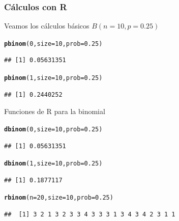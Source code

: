 \documentclass[handout]{beamer}\usepackage[]{graphicx}\usepackage[]{color}
\makeatletter
\newcommand{\hlnum}[1]{\textcolor[rgb]{0.686,0.059,0.569}{#1}}%
\newcommand{\hlstd}[1]{\textcolor[rgb]{0.345,0.345,0.345}{#1}}%
\newcommand{\hlkwc}[1]{\textcolor[rgb]{0.333,0.667,0.333}{#1}}%
\newcommand{\hlkwd}[1]{\textcolor[rgb]{0.737,0.353,0.396}{\textbf{#1}}}%
\newenvironment{kframe}{%
 \def\at@end@of@kframe{}%
 \ifinner\ifhmode%
  \def\at@end@of@kframe{\end{minipage}}%
  \begin{minipage}{\columnwidth}%
 \fi\fi%
 \def\FrameCommand##1{\hskip\@totalleftmargin \hskip-\fboxsep
 \colorbox{shadecolor}{##1}\hskip-\fboxsep
     \hskip-\linewidth \hskip-\@totalleftmargin \hskip\columnwidth}%
 \MakeFramed {\advance\hsize-\width
   \@totalleftmargin\z@ \linewidth\hsize
   \@setminipage}}%
 {\par\unskip\endMakeFramed%
 \at@end@of@kframe}
\newenvironment{knitrout}{}{} %
\theoremstyle{plain}
\theoremstyle{definition}
\makeatother
\begin{document}
\begin{frame}[fragile]
\frametitle{Cálculos con R}
Veamos los cálculos básicos $B(n=10,p=0.25)$

\begin{knitrout}
\color{fgcolor}\begin{kframe}
\begin{alltt}
\hlkwd{pbinom}\hlstd{(}\hlnum{0}\hlstd{,}\hlkwc{size}\hlstd{=}\hlnum{10}\hlstd{,}\hlkwc{prob}\hlstd{=}\hlnum{0.25}\hlstd{)}
\end{alltt}
\begin{verbatim}
## [1] 0.05631351
\end{verbatim}
\begin{alltt}
\hlkwd{pbinom}\hlstd{(}\hlnum{1}\hlstd{,}\hlkwc{size}\hlstd{=}\hlnum{10}\hlstd{,}\hlkwc{prob}\hlstd{=}\hlnum{0.25}\hlstd{)}
\end{alltt}
\begin{verbatim}
## [1] 0.2440252
\end{verbatim}
\end{kframe}
\end{knitrout}

\end{frame}

\begin{frame}[fragile]
Funciones de R para la binomial 

\begin{knitrout}
\color{fgcolor}\begin{kframe}
\begin{alltt}
\hlkwd{dbinom}\hlstd{(}\hlnum{0}\hlstd{,}\hlkwc{size}\hlstd{=}\hlnum{10}\hlstd{,}\hlkwc{prob}\hlstd{=}\hlnum{0.25}\hlstd{)}
\end{alltt}
\begin{verbatim}
## [1] 0.05631351
\end{verbatim}
\begin{alltt}
\hlkwd{dbinom}\hlstd{(}\hlnum{1}\hlstd{,}\hlkwc{size}\hlstd{=}\hlnum{10}\hlstd{,}\hlkwc{prob}\hlstd{=}\hlnum{0.25}\hlstd{)}
\end{alltt}
\begin{verbatim}
## [1] 0.1877117
\end{verbatim}
\begin{alltt}
\hlkwd{rbinom}\hlstd{(}\hlkwc{n}\hlstd{=}\hlnum{20}\hlstd{,}\hlkwc{size} \hlstd{=} \hlnum{10}\hlstd{,}\hlkwc{prob}\hlstd{=}\hlnum{0.25}\hlstd{)}
\end{alltt}
\begin{verbatim}
##  [1] 3 2 1 3 2 3 3 4 3 3 3 1 3 4 3 4 2 3 1 1
\end{verbatim}
\end{kframe}
\end{knitrout}

\end{frame}
\end{document}

